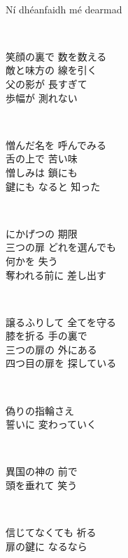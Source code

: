 \begin{lyrics}
\\
Ní dhéanfaidh mé dearmad

\\
\begin{japanese}
笑顔の裏で 数を数える\\
敵と味方の 線を引く\\
父の影が 長すぎて\\
歩幅が 測れない
\end{japanese}

\\
\begin{japanese}
憎んだ名を 呼んでみる\\
舌の上で 苦い味\\
憎しみは 鎖にも\\
鍵にも なると 知った
\end{japanese}

\\
\begin{japanese}
にかげつの 期限\\
三つの扉 どれを選んでも\\
何かを 失う\\
奪われる前に 差し出す
\end{japanese}

\\
\begin{japanese}
譲るふりして 全てを守る\\
膝を折る 手の裏で\\
三つの扉の 外にある\\
四つ目の扉を 探している
\end{japanese}

\\
\begin{japanese}
偽りの指輪さえ\\
誓いに 変わっていく\\
\end{japanese}
\\
\begin{japanese}
異国の神の 前で\\
頭を垂れて 笑う\\
\end{japanese}
\\
\begin{japanese}
信じてなくても 祈る\\
扉の鍵に なるなら
\end{japanese}


\end{lyrics}
